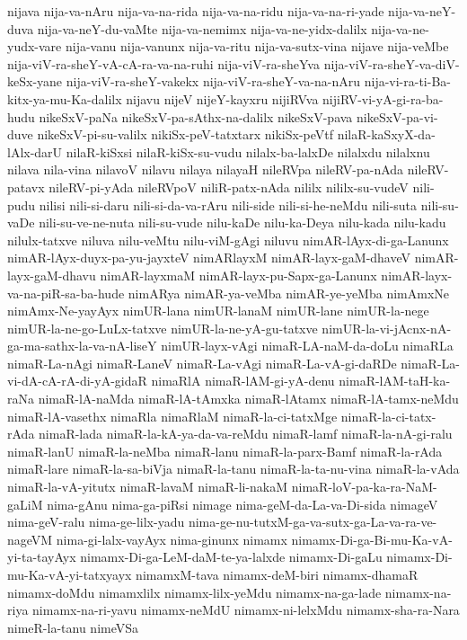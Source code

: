 {nijava
nija-va-nAru
nija-va-na-rida
nija-va-na-ridu
nija-va-na-ri-yade
nija-va-neY-duva
nija-va-neY-du-vaMte
nija-va-nemimx
nija-va-ne-yidx-dalilx
nija-va-ne-yudx-vare
nija-vanu
nija-vanunx
nija-va-ritu
nija-va-sutx-vina
nijave
nija-veMbe
nija-viV-ra-sheY-vA-cA-ra-va-na-ruhi
nija-viV-ra-sheYva
nija-viV-ra-sheY-va-diV-keSx-yane
nija-viV-ra-sheY-vakekx
nija-viV-ra-sheY-va-na-nAru
nija-vi-ra-ti-Ba-kitx-ya-mu-Ka-dalilx
nijavu
nijeV
nijeY-kayxru
nijiRVva
nijiRV-vi-yA-gi-ra-ba-hudu
nikeSxV-paNa
nikeSxV-pa-sAthx-na-dalilx
nikeSxV-pava
nikeSxV-pa-vi-duve
nikeSxV-pi-su-valilx
nikiSx-peV-tatxtarx
nikiSx-peVtf
nilaR-kaSxyX-da-lAlx-darU
nilaR-kiSxsi
nilaR-kiSx-su-vudu
nilalx-ba-lalxDe
nilalxdu
nilalxnu
nilava
nila-vina
nilavoV
nilavu
nilaya
nilayaH
nileRVpa
nileRV-pa-nAda
nileRV-patavx
nileRV-pi-yAda
nileRVpoV
niliR-patx-nAda
nililx
nililx-su-vudeV
nili-pudu
nilisi
nili-si-daru
nili-si-da-va-rAru
nili-side
nili-si-he-neMdu
nili-suta
nili-su-vaDe
nili-su-ve-ne-nuta
nili-su-vude
nilu-kaDe
nilu-ka-Deya
nilu-kada
nilu-kadu
nilulx-tatxve
niluva
nilu-veMtu
nilu-viM-gAgi
niluvu
nimAR-lAyx-di-ga-Lanunx
nimAR-lAyx-duyx-pa-yu-jayxteV
nimARlayxM
nimAR-layx-gaM-dhaveV
nimAR-layx-gaM-dhavu
nimAR-layxmaM
nimAR-layx-pu-Sapx-ga-Lanunx
nimAR-layx-va-na-piR-sa-ba-hude
nimARya
nimAR-ya-veMba
nimAR-ye-yeMba
nimAmxNe
nimAmx-Ne-yayAyx
nimUR-lana
nimUR-lanaM
nimUR-lane
nimUR-la-nege
nimUR-la-ne-go-LuLx-tatxve
nimUR-la-ne-yA-gu-tatxve
nimUR-la-vi-jAcnx-nA-ga-ma-sathx-la-va-nA-liseY
nimUR-layx-vAgi
nimaR-LA-naM-da-doLu
nimaRLa
nimaR-La-nAgi
nimaR-LaneV
nimaR-La-vAgi
nimaR-La-vA-gi-daRDe
nimaR-La-vi-dA-cA-rA-di-yA-gidaR
nimaRlA
nimaR-lAM-gi-yA-denu
nimaR-lAM-taH-ka-raNa
nimaR-lA-naMda
nimaR-lA-tAmxka
nimaR-lAtamx
nimaR-lA-tamx-neMdu
nimaR-lA-vasethx
nimaRla
nimaRlaM
nimaR-la-ci-tatxMge
nimaR-la-ci-tatx-rAda
nimaR-lada
nimaR-la-kA-ya-da-va-reMdu
nimaR-lamf
nimaR-la-nA-gi-ralu
nimaR-lanU
nimaR-la-neMba
nimaR-lanu
nimaR-la-parx-Bamf
nimaR-la-rAda
nimaR-lare
nimaR-la-sa-biVja
nimaR-la-tanu
nimaR-la-ta-nu-vina
nimaR-la-vAda
nimaR-la-vA-yitutx
nimaR-lavaM
nimaR-li-nakaM
nimaR-loV-pa-ka-ra-NaM-gaLiM
nima-gAnu
nima-ga-piRsi
nimage
nima-geM-da-La-va-Di-sida
nimageV
nima-geV-ralu
nima-ge-lilx-yadu
nima-ge-nu-tutxM-ga-va-sutx-ga-La-va-ra-ve-nageVM
nima-gi-lalx-vayAyx
nima-ginunx
nimamx
nimamx-Di-ga-Bi-mu-Ka-vA-yi-ta-tayAyx
nimamx-Di-ga-LeM-daM-te-ya-lalxde
nimamx-Di-gaLu
nimamx-Di-mu-Ka-vA-yi-tatxyayx
nimamxM-tava
nimamx-deM-biri
nimamx-dhamaR
nimamx-doMdu
nimamxlilx
nimamx-lilx-yeMdu
nimamx-na-ga-lade
nimamx-na-riya
nimamx-na-ri-yavu
nimamx-neMdU
nimamx-ni-lelxMdu
nimamx-sha-ra-Nara
nimeR-la-tanu
nimeVSa
}
